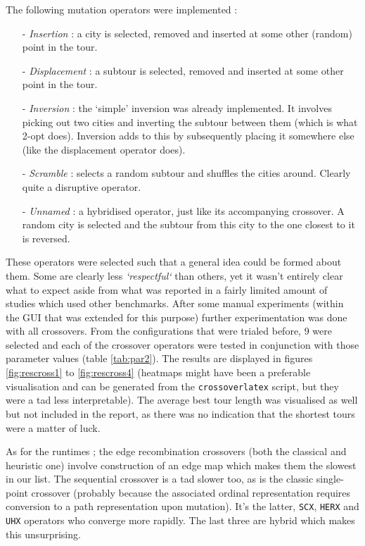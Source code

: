 The following mutation operators were implemented :
\begin{itemize}
\item[-] \textit{Insertion} : a city is selected, removed and inserted at some other (random) point in the tour.
\item[-] \textit{Displacement} : a subtour is selected, removed and inserted at some other point in the tour.
\item[-] \textit{Inversion} : the `simple' inversion was already implemented. It involves picking out two cities and inverting the subtour between them (which is what 2-opt does). Inversion adds to this by subsequently placing it somewhere else (like the displacement operator does).
\item[-] \textit{Scramble} : selects a random subtour and shuffles the cities around. Clearly quite a disruptive operator.
\item[-] \textit{Unnamed} : a hybridised operator, just like its accompanying crossover. A random city is selected and the subtour from this city to the one closest to it is reversed.
\end{itemize}
These operators were selected such that a general idea could be formed about them. Some are clearly less \textit{`respectful`} than others, yet it wasn't entirely clear what to expect aside from what was reported in a fairly limited amount of studies which used other benchmarks. After some manual experiments (within the GUI that was extended for this purpose) further experimentation was done with all crossovers. From the configurations that were trialed before, 9 were selected and each of the crossover operators were tested in conjunction with those parameter values (table \ref{tab:par2}). The results are displayed in figures \ref{fig:rescross1} to \ref{fig:rescross4} (heatmaps might have been a preferable visualisation and can be generated from the \texttt{crossoverlatex} script, but they were a tad less interpretable). The average best tour length was visualised as well but not included in the report, as there was no indication that the shortest tours were a matter of luck.\\

\par\noindent As for the runtimes ; the edge recombination crossovers (both the classical and heuristic one) involve construction of an edge map which makes them the slowest in our list. The sequential crossover is a tad slower too, as is the classic single-point crossover (probably because the associated ordinal representation requires conversion to a path representation upon mutation). It's the latter, \texttt{SCX}, \texttt{HERX} and \texttt{UHX} operators who converge more rapidly. The last three are hybrid which makes this unsurprising.

